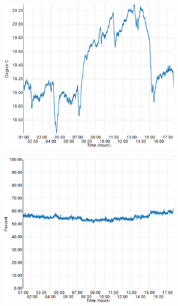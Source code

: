 \documentclass{article}      %
\begin{document}
\begin{figure}[ht]
  \begin{subfigure}[c]{0.5\textwidth}
    \includegraphics[width=1\textwidth]{expEval/Temp_09-02-2018.PNG}
    \label{fig:evalTemp}
  \end{subfigure}
  \begin{subfigure}[c]{0.5\textwidth}
    \includegraphics[width=1\textwidth]{expEval/Hum_09-02-2018.PNG}

\end{subfigure}
\end{figure}
\end{document}
